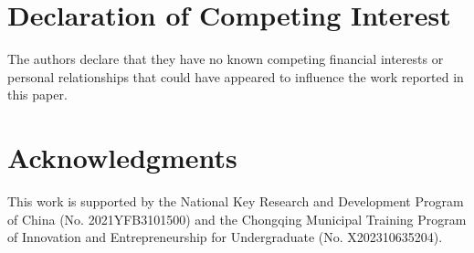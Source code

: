 \documentclass[a4paper]{cas-sc}
\begin{document}
\printcredits


\section*{Declaration of Competing Interest}
The authors declare that they have no known competing financial interests or personal relationships that could have appeared to influence the work reported in this paper.


\section*{Acknowledgments}
This work is supported by the National Key Research and  Development  Program  of  China (No. 2021YFB3101500) and the Chongqing Municipal Training Program of Innovation and Entrepreneurship for Undergraduate (No. X202310635204).




%
% 

% 
 

\vfill
\end{document}
